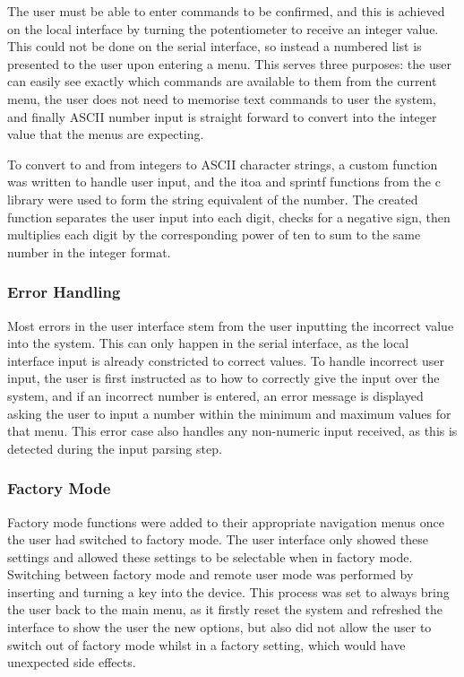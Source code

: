 \documentclass[]{report}
\begin{document}
The user must be able to enter commands to be confirmed, and this is achieved on the local interface by turning the potentiometer to receive an integer value. This could not be done on the serial interface, so instead a numbered list is presented to the user upon entering a menu. This serves three purposes: the user can easily see exactly which commands are available to them from the current menu, the user does not need to memorise text commands to user the system, and finally ASCII number input is straight forward to convert into the integer value that the menus are expecting.

To convert to and from integers to ASCII character strings, a custom function was written to handle user input, and the itoa and sprintf functions from the c library were used to form the string equivalent of the number. The created function separates the user input into each digit, checks for a negative sign, then multiplies each digit by the corresponding power of ten to sum to the same number in the integer format.

\subsubsection{Error Handling}
Most errors in the user interface stem from the user inputting the incorrect value into the system. This can only happen in the serial interface, as the local interface input is already constricted to correct values. To handle incorrect user input, the user is first instructed as to how to correctly give the input over the system, and if an incorrect number is entered, an error message is displayed asking the user to input a number within the minimum and maximum values for that menu. This error case also handles any non-numeric input received, as this is detected during the input parsing step.

\subsubsection{Factory Mode}
Factory mode functions were added to their appropriate navigation menus once the user had switched to factory mode. The user interface only showed these settings and allowed these settings to be selectable when in factory mode. Switching between factory mode and remote user mode was performed by inserting and turning a key into the device. This process was set to always bring the user back to the main menu, as it firstly reset the system and refreshed the interface to show the user the new options, but also  did not allow the user to switch out of factory mode whilst in a factory setting, which would have unexpected side effects.
\end{document}
